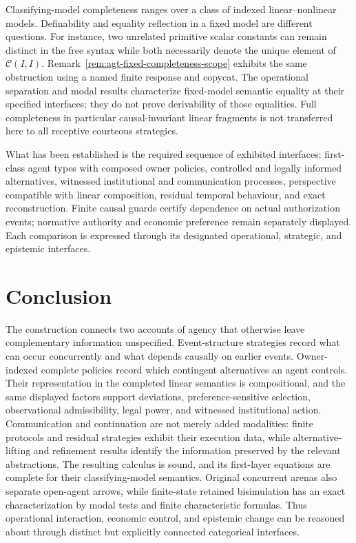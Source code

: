 \documentclass[11pt,a4paper]{article}
\numberwithin{equation}{section}
\theoremstyle{definition}
\theoremstyle{remark}
\theoremstyle{plain}
\providecommand{\cC}{\mathcal{C}}
\begin{document}
Classifying-model completeness ranges over a class of indexed
linear--nonlinear models. Definability and equality reflection in a
fixed model are different questions. For instance, two unrelated
primitive scalar constants can remain distinct in the free syntax
while both necessarily denote the unique element of $\cC(I,I)$.
Remark~\ref{rem:agt-fixed-completeness-scope} exhibits the same
obstruction using a named finite response and copycat. The operational
separation and modal results characterize fixed-model semantic equality
at their specified interfaces; they do not prove derivability of those
equalities. Full completeness in particular causal-invariant linear
fragments \citep{agt-CastellanYoshida} is not transferred here to all
receptive courteous strategies.

What has been established is the required sequence of exhibited
interfaces: first-class agent types with composed owner policies,
controlled and legally informed alternatives, witnessed institutional
and communication processes, perspective compatible with linear
composition, residual temporal behaviour, and exact reconstruction.
Finite causal guards certify dependence on actual authorization events;
normative authority and economic preference remain separately displayed.
Each comparison is expressed through its designated operational,
strategic, and epistemic interfaces.

\section*{Conclusion}

The construction connects two accounts of agency that otherwise
leave complementary information unspecified. Event-structure strategies
record what can occur concurrently and what depends causally on earlier
events. Owner-indexed complete policies record which contingent
alternatives an agent controls. Their representation in the completed
linear semantics is compositional, and the same displayed factors
support deviations, preference-sensitive selection, observational
admissibility, legal power, and witnessed institutional action.
Communication and continuation are not merely added modalities: finite
protocols and residual strategies exhibit their execution data, while
alternative-lifting and refinement results identify the information
preserved by the relevant abstractions. The resulting calculus is sound,
and its first-layer equations are complete for their classifying-model
semantics. Original concurrent arenas also separate open-agent arrows,
while finite-state retained bisimulation has an exact characterization
by modal tests and finite characteristic formulas. Thus operational
interaction, economic control, and epistemic change can be reasoned
about through distinct but explicitly connected categorical interfaces.
\end{document}
